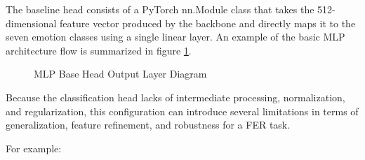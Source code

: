 The baseline head consists of a \gls{PyTorch} nn.Module class that takes the 512-dimensional feature vector produced by the backbone and directly maps it to the seven emotion classes using a single linear layer. An example  of the basic MLP architecture flow is summarized in figure \ref{fig:poster_classification_head_base}.

\begin{figure}[H]
\centering
{}
\caption{MLP Base Head Output Layer Diagram}
\label{fig:poster_classification_head_base}
\end{figure}

Because the classification head lacks of intermediate processing, normalization, and regularization, this configuration can introduce several limitations in terms of generalization, feature refinement, and robustness for a FER task.


For example: 


